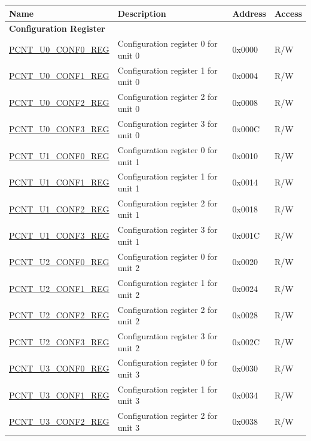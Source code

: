 \begin{longtable}{ | p{6cm} | p{7.2cm} | p{1.3cm} | p{1cm} | }
\hline\rowcolor{lightgray}
\textbf{Name} & \textbf{Description} &  \textbf{Address} & \textbf{Access} \\ \hline
\endhead
\multicolumn{4}{|l|}{\textbf{Configuration Register}} \\ \hline
\hyperref[regdesc:PCNTUNCONF0REG]{PCNT\_U0\_CONF0\_REG} & Configuration register 0 for unit 0 & 0x0000 & R/W \\ \hline
\hyperref[regdesc:PCNTUNCONF1REG]{PCNT\_U0\_CONF1\_REG} & Configuration register 1 for unit 0 & 0x0004 & R/W \\ \hline
\hyperref[regdesc:PCNTUNCONF2REG]{PCNT\_U0\_CONF2\_REG} & Configuration register 2 for unit 0 & 0x0008 & R/W \\ \hline
\hyperref[regdesc:PCNTUNCONF3REG]{PCNT\_U0\_CONF3\_REG} & Configuration register 3 for unit 0 & 0x000C & R/W \\ \hline
\hyperref[regdesc:PCNTUNCONF0REG]{PCNT\_U1\_CONF0\_REG} & Configuration register 0 for unit 1 & 0x0010 & R/W \\ \hline
\hyperref[regdesc:PCNTUNCONF1REG]{PCNT\_U1\_CONF1\_REG} & Configuration register 1 for unit 1 & 0x0014 & R/W \\ \hline
\hyperref[regdesc:PCNTUNCONF2REG]{PCNT\_U1\_CONF2\_REG} & Configuration register 2 for unit 1 & 0x0018 & R/W \\ \hline
\hyperref[regdesc:PCNTUNCONF3REG]{PCNT\_U1\_CONF3\_REG} & Configuration register 3 for unit 1 & 0x001C & R/W \\ \hline
\hyperref[regdesc:PCNTUNCONF0REG]{PCNT\_U2\_CONF0\_REG} & Configuration register 0 for unit 2 & 0x0020 & R/W \\ \hline
\hyperref[regdesc:PCNTUNCONF1REG]{PCNT\_U2\_CONF1\_REG} & Configuration register 1 for unit 2 & 0x0024 & R/W \\ \hline
\hyperref[regdesc:PCNTUNCONF2REG]{PCNT\_U2\_CONF2\_REG} & Configuration register 2 for unit 2 & 0x0028 & R/W \\ \hline
\hyperref[regdesc:PCNTUNCONF3REG]{PCNT\_U2\_CONF3\_REG} & Configuration register 3 for unit 2 & 0x002C & R/W \\ \hline
\hyperref[regdesc:PCNTUNCONF0REG]{PCNT\_U3\_CONF0\_REG} & Configuration register 0 for unit 3 & 0x0030 & R/W \\ \hline
\hyperref[regdesc:PCNTUNCONF1REG]{PCNT\_U3\_CONF1\_REG} & Configuration register 1 for unit 3 & 0x0034 & R/W \\ \hline
\hyperref[regdesc:PCNTUNCONF2REG]{PCNT\_U3\_CONF2\_REG} & Configuration register 2 for unit 3 & 0x0038 & R/W \\ \hline

\end{longtable}
